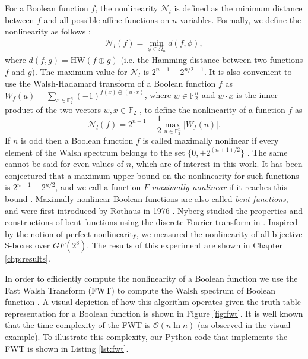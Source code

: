For a Boolean function $f$, the nonlinearity $\mathcal{N}_l$ is defined as the minimum distance between $f$ and all possible affine functions on $n$ variables. Formally, we define the nonlinearity as follows \cite{cusik09-BooleanFunctions}:
\begin{align*}
\mathcal{N}_l(f) = \min_{\phi \in \Omega_n} d(f, \phi),
\end{align*}
where $d(f, g) = $HW$(f \oplus g)$ (i.e. the Hamming distance between two functions $f$ and $g$). The maximum value for $\mathcal{N}_l$ is $2^{n-1} - 2^{n/2 - 1}$.
It is also convenient to use the Walsh-Hadamard transform of a Boolean function $f$ as $W_f(u) = \sum_{x \in \mathbb{F}_2^n} (-1)^{f(x) \oplus (u \cdot x)}$, where $w \in \mathbb{F}_2^n$ and $w \cdot x$ is the inner product of the two vectors $w, x \in \mathbb{F}_2$ \cite{cusik09-BooleanFunctions}, to define the nonlinearity of a function $f$ as 
\begin{equation} \label{eqn:nlFromWalsh}
\mathcal{N}_l(f) = 2^{n-1} - \frac{1}{2}\max_{u \in \mathbb{F}_2^n}|W_f(u)|.
\end{equation}
If $n$ is odd then a Boolean function $f$ is called maximally nonlinear if every element of the Walsh spectrum belongs to the set $\{0, \pm 2^{(n+1)/2}\}$ \cite{Nawaz09-1}. The same cannot be said for even values of $n$, which are of interest in this work. It has been conjectured that a maximum upper bound on the nonlinearity for such functions is $2^{n-1} - 2^{n/2}$, and we call a function $F$ \emph{maximally nonlinear} if it reaches this bound \cite{Dobbertin99-1}. Maximally nonlinear Boolean functions are also called \emph{bent functions}, and were first introduced by Rothaus in 1976 \cite{Rothaus76-1}. Nyberg studied the properties and constructions of bent functions using the discrete Fourier transform in \cite{Nyberg91-1}. Inspired by the notion of perfect nonlinearity, we measured the nonlinearity of all bijective S-boxes over $GF(2^8)$. The results of this experiment are shown in Chapter \ref{chp:results}.

In order to efficiently compute the nonlinearity of a Boolean function we use the Fast Walsh Transform (FWT) to compute the Walsh spectrum of Boolean function \cite{Shanks69-1}. A visual depiction of how this algorithm operates given the truth table representation for a Boolean function is shown in Figure \ref{fig:fwt}. It is well known that the time complexity of the FWT is $\mathcal{O}(n \ln n)$ (as observed in the visual example). To illustrate this complexity, our Python code that implements the FWT is shown in Listing \ref{lst:fwt}.

